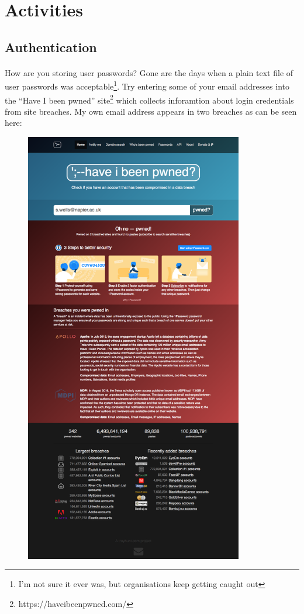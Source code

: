 \documentclass[10pt, a4paper, twosize]{article}
\begin{document}
\section*{Activities}
\subsection*{Authentication}
\paragraph{} How are you storing user passwords? Gone are the days when a plain text file of user passwords was acceptable\footnote{I'm not sure it ever was, but organisations keep getting caught out}. Try entering some of your email addresses into the ``Have I been pwned'' site\footnote{https://haveibeenpwned.com/} which collects inforamtion about login credentials from site breaches. My own email address appears in two breaches as can be seen here:

\begin{figure}[H]
\centering
\includegraphics[width=0.85\textwidth]{images/pwned}
\caption{}
\label{fig:pwned}
\end{figure}
\end{document}
